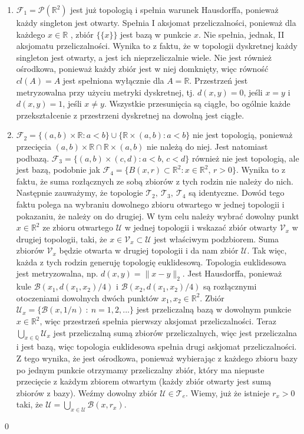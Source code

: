 \documentclass{article}
\theoremstyle{definition}%
\theoremstyle{theorem}
\renewenvironment{proof}{{\bfseries Rozwiązanie}}{\qed}
\newcommand{\R}{\mathbb{R}} %
\newcommand{\Q}{\mathbb{Q}}
\newcommand{\Pow}{\mathcal{P}} %
\newcommand{\sT}{\mathcal{T}} %
\newcommand{\sF}{\mathcal{F}} %
\newcommand{\oU}{\mathcal{U}}
\newcommand{\oV}{\mathcal{V}}
\newcommand{\oB}{\mathcal{B}}
\begin{document}
\begin{proof}
\begin{enumerate}
\item $\sF_1=\Pow (\R^2)$ jest już topologią i spełnia warunek Hausdorffa, ponieważ każdy singleton jest otwarty. Spełnia I aksjomat przeliczalności, ponieważ dla każdego $x\in\R$ , zbiór $\{\{x\}\}$ jest bazą w punkcie $x$. Nie spełnia, jednak, II aksjomatu przeliczalności. Wynika to z faktu, że w topologii dyskretnej każdy singleton jest otwarty, a jest ich nieprzeliczalnie wiele. Nie jest również ośrodkowa, ponieważ każdy zbiór jest w niej domknięty, więc równość $cl(A)=A$ jest spełniona wyłącznie dla $A=\R$. Przestrzeń jest metryzowalna przy użyciu metryki dyskretnej, tj. $d(x,y)=0$, jeśli $x=y$ i $d(x,y)=1$, jeśli  $x\not=y$. Wszystkie przesunięcia są ciągłe, bo ogólnie każde przekształcenie z przestrzeni dyskretnej na dowolną jest ciągłe.
\item $\sF_2=\{(a,b)\times\R \colon a<b\}\cup\{\R\times(a,b) \colon a<b\}$ nie jest topologią, ponieważ przecięcia $(a,b)\times\R\cap\R\times(a,b)$ nie należą do niej. Jest natomiast podbazą. $\sF_3=\{(a,b)\times (c,d) \colon  a<b,\, c<d\}$ również nie jest topologią, ale jest bazą, podobnie jak  $\sF_4=\{B(x,r)\subset \R^2\colon  x\in\R^2,\,  r>0 \}$. Wynika to z faktu, że suma rozłącznych ze sobą zbiorów z tych rodzin nie należy do nich. Następnie zauważymy, że topologie $\sT_2,\ \sT_3,\ \sT_4$ są identyczne. Dowód tego faktu polega na wybraniu dowolnego zbioru otwartego w jednej topologii i pokazaniu, że należy on do drugiej. W tym celu należy wybrać dowolny punkt $x\in\R^2$ ze zbioru otwartego $\oU$ w jednej topologii i wskazać zbiór otwarty $\oV_x$ w drugiej topologii, taki, że $x\in\oV_x\subset\oU$ jest właściwym podzbiorem. Suma zbiorów $\oV_x$ będzie otwarta w drugiej topologii i da nam zbiór $\oU$. Tak więc, każda z tych rodzin generuję topologię euklidesową. Topologia euklidesowa jest metryzowalna, np. $d(x,y)=\|x-y\|_2$. Jest Hausdorffa, ponieważ kule $\oB(x_1,d(x_1,x_2)/4)$ i $\oB(x_2,d(x_1,x_2)/4)$ są rozłącznymi otoczeniami dowolnych dwóch punktów $x_1,x_2\in\R^2$. Zbiór $\oU_x=\{\oB(x,1/n)\ :\ n=1,2,...\}$ jest przeliczalną bazą w dowolnym punkcie $x\in\R^2$, więc przestrzeń spełnia pierwszy aksjomat przeliczalności. Teraz $\bigcup_{x\in\Q}\oU_x$ jest przeliczalną sumą zbiorów przeliczalnych, więc jest przeliczalna i jest bazą, więc topologia euklidesowa spełnia drugi askjomat przeliczalności. Z tego wynika, że jest ośrodkowa, ponieważ wybierając z każdego zbioru bazy po jednym punkcie otrzymamy przeliczalny zbiór, który ma niepuste przecięcie z każdym zbiorem otwartym (każdy zbiór otwarty jest sumą zbiorów z bazy). Weźmy dowolny zbiór $\oU\in\sT_e$. Wiemy, już że istnieje $r_x>0$ taki, że $\oU=\bigcup_{x\in\oU}\oB(x,r_x)$. 

\end{enumerate}
\end{proof}
\end{document}
